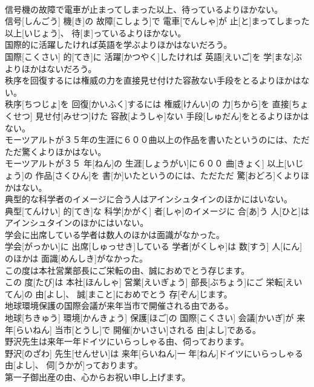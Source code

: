 \documentclass[8pt]{extreport}
\begin{document}
\begin{CJK}{UTF8}{min}
\\	信号機の故障で電車が止まってしまった以上、待っているよりほかない。	
\\	信号[しんごう] 機[き]の 故障[こしょう]で 電車[でんしゃ]が 止[と]まってしまった 以上[いじょう]、 待[ま]っているよりほかない。
\\	国際的に活躍したければ英語を学ぶよりほかはないだろう。	
\\	国際[こくさい] 的[てき]に 活躍[かつやく]したければ 英語[えいご]を 学[まな]ぶよりほかはないだろう。
\\	秩序を回復するには権威の力を直接見せ付けた容赦ない手段をとるよりほかはない。	
\\	秩序[ちつじょ]を 回復[かいふく]するには 権威[けんい]の 力[ちから]を 直接[ちょくせつ] 見せ付[みせつ]けた 容赦[ようしゃ]ない 手段[しゅだん]をとるよりほかはない。
\\	モーツアルトが３５年の生涯に６００曲以上の作品を書いたというのには、ただただ驚くよりほかはない。	
\\	モーツアルトが３５ 年[ねん]の 生涯[しょうがい]に６００ 曲[きょく] 以上[いじょう]の 作品[さくひん]を 書[か]いたというのには、ただただ 驚[おどろ]くよりほかはない。
\\	典型的な科学者のイメージに合う人はアインシュタインのほかにはいない。	
\\	典型[てんけい] 的[てき]な 科学[かがく] 者[しゃ]のイメージに 合[あ]う 人[ひと]はアインシュタインのほかにはいない。
\\	学会に出席している学者は数人のほかは面識がなかった。	
\\	学会[がっかい]に 出席[しゅっせき]している 学者[がくしゃ]は 数[すう] 人[にん]のほかは 面識[めんしき]がなかった。
\\	この度は本社営業部長にご栄転の由、誠におめでとう存じます。	
\\	この 度[たび]は 本社[ほんしゃ] 営業[えいぎょう] 部長[ぶちょう]にご 栄転[えいてん]の 由[よし]、 誠[まこと]におめでとう 存[ぞん]じます。
\\	地球環境保護の国際会議が来年当市で開催される由である。	
\\	地球[ちきゅう] 環境[かんきょう] 保護[ほご]の 国際[こくさい] 会議[かいぎ]が 来年[らいねん] 当市[とうし]で 開催[かいさい]される 由[よし]である。
\\	野沢先生は来年一年ドイツにいらっしゃる由、伺っております。	
\\	野沢[のざわ] 先生[せんせい]は 来年[らいねん]一 年[ねん]ドイツにいらっしゃる 由[よし]、 伺[うかが]っております。
\\	第一子御出産の由、心からお祝い申し上げます。	

\end{CJK}
\end{document}
